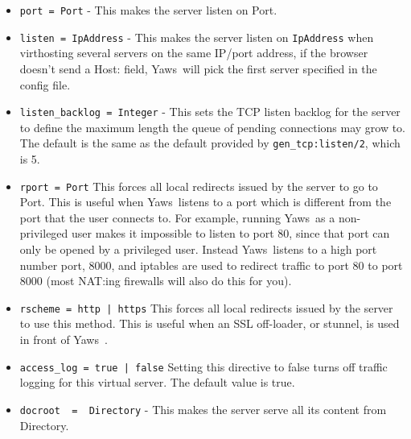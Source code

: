 \documentclass[11pt,oneside,english]{book}
\newcommand{\Yaws}            %
        {{\sc Yaws}}
\begin{document}
\begin{itemize}

\item       \verb+port = Port+ -
              This makes the server listen on Port.

\item        \verb+listen = IpAddress+ -
              This makes the  server  listen  on  \verb+IpAddress+  when
              virthosting  several  servers  on  the same IP/port
              address, if the browser doesn't send a Host: field,
              \Yaws\   will  pick  the first server specified in the
              config file.

\item        \verb+listen_backlog = Integer+ -
              This sets the TCP listen backlog for the server to
              define the maximum length the queue of pending
              connections may grow to. The default is the same as
              the default provided by \verb+gen_tcp:listen/2+, which
              is 5.

\item       \verb+rport = Port+
              This forces  all  local  redirects  issued  by  the
              server  to  go  to  Port.  This is useful when \Yaws\
              listens to a port which is different from the  port
              that  the  user  connects  to. For example, running
              \Yaws\  as a non-privileged user makes  it  impossible
              to  listen  to port 80, since that port can only be
              opened by a privileged user. Instead  \Yaws\   listens
              to  a high port number port, 8000, and iptables are
              used to redirect traffic to port 80  to  port  8000
              (most NAT:ing firewalls will also do this for you).

\item       \verb+rscheme = http | https+
              This forces  all  local  redirects  issued  by  the
              server  to  use this method. This is useful when an
              SSL off-loader, or stunnel, is  used  in  front  of
              \Yaws\ .

\item       \verb+access_log = true | false+
              Setting  this  directive  to  false turns off
              traffic logging for this virtual server. The
              default value is true.

\item       \verb+docroot  =  Directory+ -
              This makes the server serve all its content from
              Directory.


\end{itemize}
\end{document}
